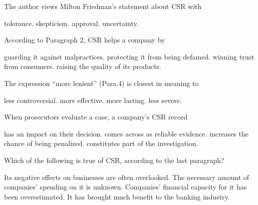 \item The author views Milton Friedman's statement about CSR with
\begin{tasks}
	\task tolerance.
	\task skepticism.
	\task approval.
	\task uncertainty.
\end{tasks}
\item According to Paragraph 2, CSR helps a company by
\begin{tasks}
	\task guarding it against malpractices.
	\task protecting it from being defamed.
	\task winning trust from consumers.
	\task raising the quality of its products.
\end{tasks}
\item The expression ``more lenient'' (Para.4) is closest in meaning to
\begin{tasks}
	\task less controversial.
	\task more effective.
	\task more lasting.
	\task less severe.
\end{tasks}
\item When prosecutors evaluate a case, a company's CSR record
\begin{tasks}
	\task has an impact on their decision.
	\task comes across as reliable evidence.
	\task increases the chance of being penalized.
	\task constitutes part of the investigation.
\end{tasks}
\item Which of the following is true of CSR, according to the last paragraph?
\begin{tasks}
	\task Its negative effects on businesses are often overlooked.
	\task The necessary amount of companies' spending on it is unknown.
	\task Companies' financial capacity for it has been overestimated.
	\task It has brought much benefit to the banking industry.
\end{tasks}